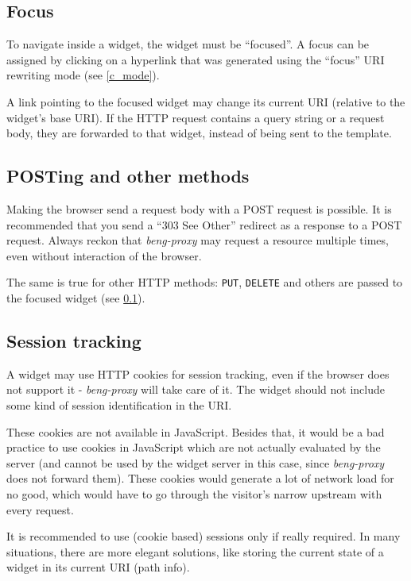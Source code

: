 \documentclass[a4paper,12pt]{article}
\begin{document}
\subsection{Focus}
\label{focus}

To navigate inside a widget, the widget must be ``focused''.  A focus
can be assigned by clicking on a hyperlink that was generated using
the ``focus'' URI rewriting mode (see \ref{c_mode}).

A link pointing to the focused widget may change its current URI
(relative to the widget's base URI).  If the HTTP request contains a
query string or a request body, they are forwarded to that widget,
instead of being sent to the template.

\subsection{POSTing and other methods}

Making the browser send a request body with a POST request is
possible.  It is recommended that you send a ``303 See Other''
redirect as a response to a POST request.  Always reckon that
\emph{beng-proxy} may request a resource multiple times, even without
interaction of the browser.

The same is true for other HTTP methods: \texttt{PUT}, \texttt{DELETE}
and others are passed to the focused widget (see \ref{focus}).

\subsection{Session tracking}

A widget may use HTTP cookies for session tracking, even if the
browser does not support it - \emph{beng-proxy} will take care of it.
The widget should not include some kind of session identification in
the URI.

These cookies are not available in JavaScript.  Besides that, it would
be a bad practice to use cookies in JavaScript which are not actually
evaluated by the server (and cannot be used by the widget server in
this case, since \emph{beng-proxy} does not forward them).  These
cookies would generate a lot of network load for no good, which would
have to go through the visitor's narrow upstream with every request.

It is recommended to use (cookie based) sessions only if really
required.  In many situations, there are more elegant solutions, like
storing the current state of a widget in its current URI (path info).
\end{document}
